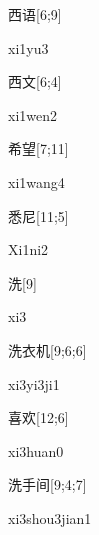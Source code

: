 \begin{verbete}[xi1yu3]{西语}[6;9]
\begin{pronuncia}{xi1yu3}
\end{pronuncia}
\end{verbete}

\begin{verbete}[xi1wen2]{西文}[6;4]
\begin{pronuncia}{xi1wen2}
\end{pronuncia}
\end{verbete}

\begin{verbete}[xi1wang4]{希望}[7;11]
\begin{pronuncia}{xi1wang4}
\end{pronuncia}
\end{verbete}

\begin{verbete}[Xi1ni2]{悉尼}[11;5]
\begin{pronuncia}{Xi1ni2}
\end{pronuncia}
\end{verbete}

\begin{verbete}[xi3]{洗}[9]
\begin{pronuncia}{xi3}
\end{pronuncia}
\end{verbete}

\begin{verbete}[xi3yi3ji1]{洗衣机}[9;6;6]
\begin{pronuncia}{xi3yi3ji1}
\end{pronuncia}
\end{verbete}

\begin{verbete}[xi3huan0]{喜欢}[12;6]
\begin{pronuncia}{xi3huan0}
\end{pronuncia}
\end{verbete}

\begin{verbete}{洗手间}[9;4;7]
\begin{pronuncia}{xi3shou3jian1}
\end{pronuncia}
\end{verbete}


